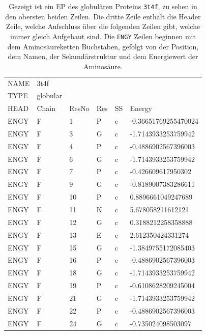 \begin{table}[]
\centering
\caption{Gezeigt ist ein \ac{EP} des globulären Proteins \texttt{3t4f}, zu sehen in den obersten beiden Zeilen. Die dritte Zeile enthält die Header Zeile, welche Aufschluss über die folgenden Zeilen gibt, welche immer gleich Aufgebaut sind. Die \texttt{ENGY} Zeilen beginnen mit dem Aminosäureketten Buchstaben, gefolgt von der Position, dem Namen, der Sekundärstruktur und dem Energiewert der Aminosäure.}
\label{tab:EP}
\begin{tabular}{llllll}
NAME & 3t4f &  &  &  &  \\
TYPE & globular &  &  &  &  \\
HEAD & Chain & ResNo & Res & SS & Energy \\
ENGY & F & 1 & P & c & -0.36651769255470024 \\
ENGY & F & 3 & G & c & -1.7143933253759942 \\
ENGY & F & 4 & P & c & -0.4886902567396003 \\
ENGY & F & 6 & G & c & -1.7143933253759942 \\
ENGY & F & 7 & P & c & -0.426609617950302 \\
ENGY & F & 9 & G & c & -0.8189007383286611 \\
ENGY & F & 10 & P & c & 0.8896661049247689 \\
ENGY & F & 11 & K & c & 5.678058211612121 \\
ENGY & F & 12 & G & c & 0.3188212258358888 \\
ENGY & F & 13 & E & c & 2.612350424331274 \\
ENGY & F & 15 & G & c & -1.3849755172085403 \\
ENGY & F & 16 & P & c & -0.4886902567396003 \\
ENGY & F & 18 & G & c & -1.7143933253759942 \\
ENGY & F & 19 & P & c & -0.6108628209245004 \\
ENGY & F & 21 & G & c & -1.7143933253759942 \\
ENGY & F & 22 & P & c & -0.4886902567396003 \\
ENGY & F & 24 & G & c & -0.735024098503097
\end{tabular}
\end{table}

